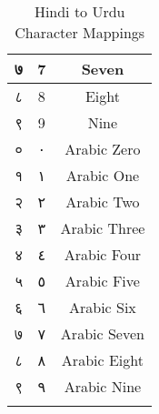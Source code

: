 \begin{longtable}[c]{|c|c|c|}
\textsanskrit{७}               & 7            & Seven                \\ \hline
\textsanskrit{८}               & 8            & Eight                \\ \hline
\textsanskrit{९}               & 9            & Nine                 \\ \hline
\textsanskrit{०}               & \textarabic{٠}            & Arabic Zero                 \\ \hline
\textsanskrit{१}               & \textarabic{١}            & Arabic One                  \\ \hline
\textsanskrit{२}               & \textarabic{٢}            & Arabic Two                  \\ \hline
\textsanskrit{३}               & \textarabic{٣}            & Arabic Three                \\ \hline
\textsanskrit{४}               & \textarabic{٤}            & Arabic Four                 \\ \hline
\textsanskrit{५}               & \textarabic{٥}            & Arabic Five                 \\ \hline
\textsanskrit{६}               & \textarabic{٦}            & Arabic Six                  \\ \hline
\textsanskrit{७}               & \textarabic{٧}            & Arabic Seven                \\ \hline
\textsanskrit{८}               & \textarabic{٨}            & Arabic Eight                \\ \hline
\textsanskrit{९}               & \textarabic{٩}            & Arabic Nine                 \\ \hline
\caption{Hindi to Urdu Character Mappings}
\label{table:hindi_to_urdu}
\end{longtable}
